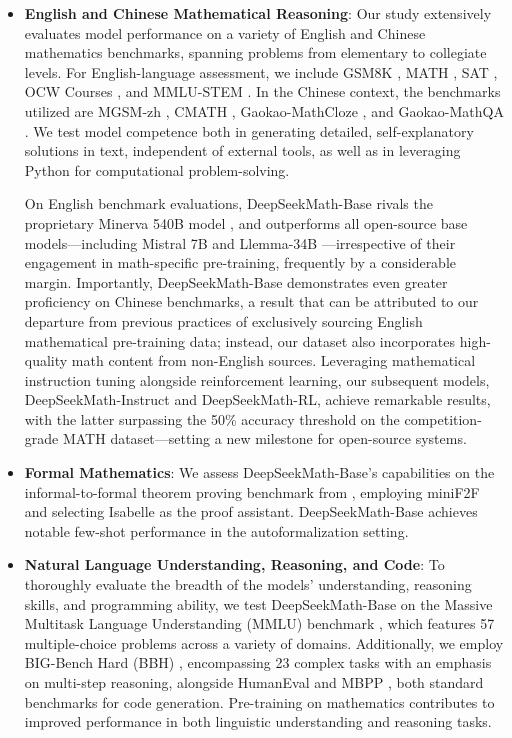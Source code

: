 \begin{itemize}[topsep=0pt]
    \item \textbf{English and Chinese Mathematical Reasoning}: Our study extensively evaluates model performance on a variety of English and Chinese mathematics benchmarks, spanning problems from elementary to collegiate levels. For English-language assessment, we include GSM8K \citep{gsm8k}, MATH \citep{MATH}, SAT \citep{llemma}, OCW Courses \citep{minerva}, and MMLU-STEM \citep{mmlu}. In the Chinese context, the benchmarks utilized are MGSM-zh \citep{mgsm}, CMATH \citep{wei2023cmath}, Gaokao-MathCloze \citep{agieval}, and Gaokao-MathQA \citep{agieval}. We test model competence both in generating detailed, self-explanatory solutions in text, independent of external tools, as well as in leveraging Python for computational problem-solving.

On English benchmark evaluations, DeepSeekMath-Base rivals the proprietary Minerva 540B model \citep{minerva}, and outperforms all open-source base models—including Mistral 7B \citep{mistral} and Llemma-34B \citep{llemma}—irrespective of their engagement in math-specific pre-training, frequently by a considerable margin. Importantly, DeepSeekMath-Base demonstrates even greater proficiency on Chinese benchmarks, a result that can be attributed to our departure from previous practices \citep{minerva,llemma} of exclusively sourcing English mathematical pre-training data; instead, our dataset also incorporates high-quality math content from non-English sources. Leveraging mathematical instruction tuning alongside reinforcement learning, our subsequent models, DeepSeekMath-Instruct and DeepSeekMath-RL, achieve remarkable results, with the latter surpassing the 50\% accuracy threshold on the competition-grade MATH dataset—setting a new milestone for open-source systems.

\item \textbf{Formal Mathematics}: We assess DeepSeekMath-Base's capabilities on the informal-to-formal theorem proving benchmark from \citep{dsp_proof}, employing miniF2F \citep{minif2f} and selecting Isabelle \citep{isabelle} as the proof assistant. DeepSeekMath-Base achieves notable few-shot performance in the autoformalization setting.

\item \textbf{Natural Language Understanding, Reasoning, and Code}: To thoroughly evaluate the breadth of the models' understanding, reasoning skills, and programming ability, we test DeepSeekMath-Base on the Massive Multitask Language Understanding (MMLU) benchmark \citep{mmlu}, which features 57 multiple-choice problems across a variety of domains. Additionally, we employ BIG-Bench Hard (BBH) \citep{bbh}, encompassing 23 complex tasks with an emphasis on multi-step reasoning, alongside HumanEval \citep{codex} and MBPP \citep{mbpp}, both standard benchmarks for code generation. Pre-training on mathematics contributes to improved performance in both linguistic understanding and reasoning tasks.


\end{itemize}
